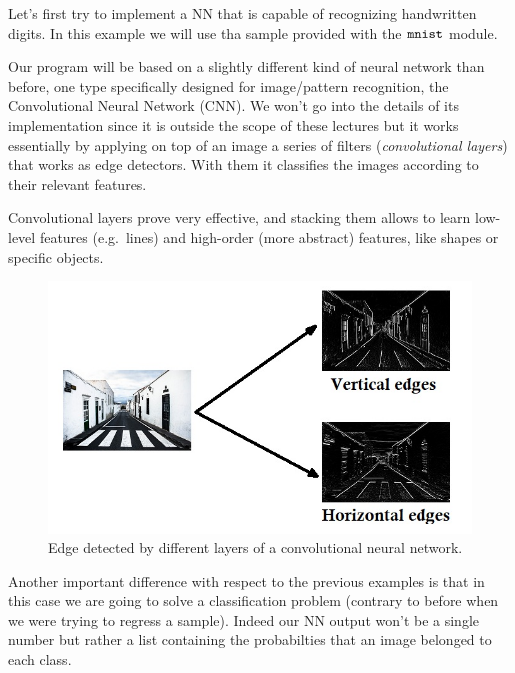 Let's first try to implement a NN that is capable of recognizing
handwritten digits. In this example we will use tha sample provided with
the \(\tt{mnist}\) module.

Our program will be based on a slightly different kind of neural network
than before, one type specifically designed for image/pattern
recognition, the Convolutional Neural Network (CNN). We won't go into
the details of its implementation since it is outside the scope of these
lectures but it works essentially by applying on top of an image a
series of filters (\emph{convolutional layers}) that works as edge
detectors. With them it classifies the images according to their
relevant features.

Convolutional layers prove very effective, and stacking them allows to
learn low-level features (e.g.~lines) and high-order (more abstract)
features, like shapes or specific objects.

\begin{figure}[htb]
	\centering
	\includegraphics[width=1.\textwidth]{figures/edges.jpg}
	\caption{Edge detected by different layers of a convolutional neural network.}
\end{figure}

Another important difference with respect to the previous examples is
that in this case we are going to solve a classification problem
(contrary to before when we were trying to regress a sample). Indeed our
NN output won't be a single number but rather a list containing the
probabilties that an image belonged to each class.


